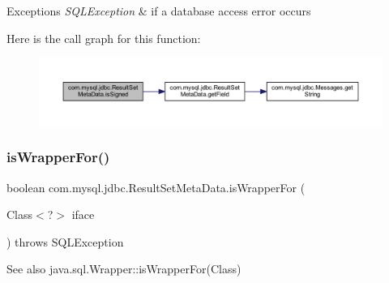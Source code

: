 \begin{DoxyExceptions}{Exceptions}
{\em S\+Q\+L\+Exception} & if a database access error occurs \\
\hline
\end{DoxyExceptions}
Here is the call graph for this function\+:
\nopagebreak
\begin{figure}[H]
\begin{center}
\leavevmode
\includegraphics[width=350pt]{classcom_1_1mysql_1_1jdbc_1_1_result_set_meta_data_ae7aab7c643d23eb2ffd6a211abb9ac8f_cgraph}
\end{center}
\end{figure}
\mbox{\label{classcom_1_1mysql_1_1jdbc_1_1_result_set_meta_data_ac7d2fbe14fac5844be098c4d508a064d}} 
\subsubsection{\texorpdfstring{is\+Wrapper\+For()}{isWrapperFor()}}
{\footnotesize\ttfamily boolean com.\+mysql.\+jdbc.\+Result\+Set\+Meta\+Data.\+is\+Wrapper\+For (\begin{DoxyParamCaption}\item[{Class$<$?$>$}]{iface }\end{DoxyParamCaption}) throws S\+Q\+L\+Exception}

\begin{DoxySeeAlso}{See also}
java.\+sql.\+Wrapper\+::is\+Wrapper\+For(\+Class) 
\end{DoxySeeAlso}
\mbox{\label{classcom_1_1mysql_1_1jdbc_1_1_result_set_meta_data_aed2b92b641e72e924cbb58197487ced1}} 
